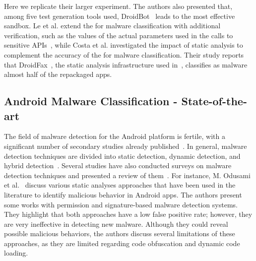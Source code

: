 Here we replicate their larger experiment. 
The authors also presented that, among five test generation tools used, DroidBot~\cite{DBLP:conf/icse/LiYGC17} leads to the most effective sandbox.
Le et al. extend the \mas for malware classification with additional verification,
such as the values of the actual parameters used in the
calls to sensitive APIs~\cite{le2018towards}, while
Costa et al.\cite{DBLP:journals/jss/CostaMMSSBNR22} investigated the impact of static analysis to complement the accuracy of the \mas
for malware classification. Their study reports that DroidFax~\cite{DBLP:conf/icsm/CaiR17a}, the static analysis infrastructure used in~\cite{DBLP:conf/wcre/BaoLL18}, classifies as malware almost half of the repackaged apps.


\subsection{Android Malware Classification - State-of-the-art}

The field of malware detection for the Android platform is fertile, with a significant number of secondary studies already published~\cite{DBLP:conf/eann/SerajPP22,DBLP:conf/icsoft/LekssaysFA20,DBLP:journals/access/WeiLWZZY17,DBLP:conf/codaspy/ZhouZJN12}. In general, malware detection techniques are divided into static detection, dynamic detection, and hybrid detection~\cite{choudhary2018haamd}. Several studies have also conducted surveys on malware detection techniques and presented a review of them~\cite{DBLP:journals/access/LiuXXZSL20,DBLP:journals/csur/TamFASC17,DBLP:conf/icai2/OdusamiAMSDM18}. For instance, M. Odusami et al.~\cite{DBLP:conf/icai2/OdusamiAMSDM18} discuss various static analyses approaches that have been used in the literature to identify malicious behavior in Android apps. The authors present some works with permission and signature-based malware detection systems. They highlight that both approaches have a low false positive rate; however, they are very ineffective in detecting new malware. Although they could reveal possible malicious behaviors, the authors discuss several limitations of these approaches, as they are limited regarding code obfuscation and dynamic code loading.


